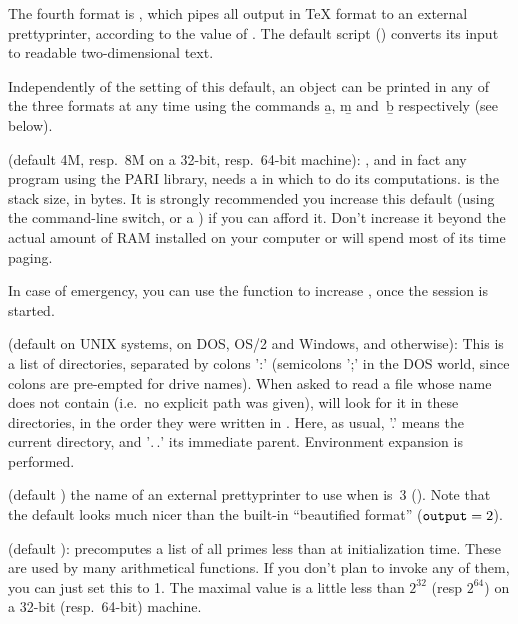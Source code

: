 The fourth format is , which pipes
all  output in TeX format to an external prettyprinter, according to the
value of . The default script () converts
its input to readable two-dimensional text.

Independently of the setting of this default, an object can be printed
in any of the three formats at any time using the commands \b{a}, \b{m}
and~\b{b} respectively (see below).

\label{se:parisize} (default 4M, resp.~8M on a 32-bit,
resp.~64-bit machine): , and in fact any program using the PARI
library, needs a  in which to do its computations. 
is the stack size, in bytes. It is strongly recommended you increase this
default (using the  command-line switch, or a ) if you can
afford it. Don't increase it beyond the actual amount of RAM installed on
your computer or  will spend most of its time paging.

In case of emergency, you can use the  function to
increase , once the session is started.

 (default  on UNIX systems,
 on DOS, OS/2 and Windows, and  otherwise):
This is a list of directories, separated by colons ':' (semicolons ';' in the
DOS world, since colons are pre-empted for drive names). When asked to read a
file whose name does not contain \kbd{/} (i.e.~no explicit path was given),
 will look for it in these directories, in the order they were written in
. Here, as usual, '.' means the current directory, and '$.\,.$' its
immediate parent. Environment expansion is performed.

 (default ) the name of an external prettyprinter to use when
 is~3 (). Note that the default
 looks much nicer than the built-in ``beautified
format'' (${\tt output} = 2$).

 (default ):  precomputes a list of
all primes less than  at initialization time. These are used
by many arithmetical functions. If you don't plan to invoke any of them, you
can just set this to 1. The maximal value is a little less than $2^32$
(resp $2^64$) on a 32-bit (resp.~64-bit) machine.

